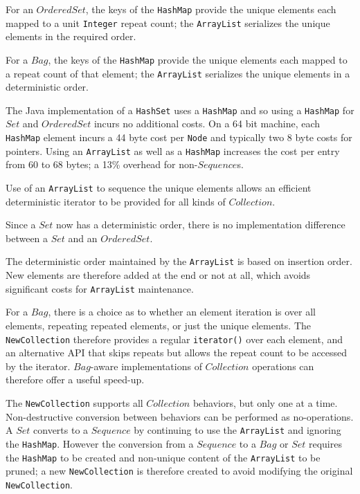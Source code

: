 \documentclass{llncs}
\begin{document}
For an $OrderedSet$, the keys of the \verb$HashMap$ provide the unique elements each mapped to a unit \verb$Integer$ repeat count; the \verb$ArrayList$ serializes the unique elements in the required order.

For a $Bag$, the keys of the \verb$HashMap$ provide the unique elements each mapped to a repeat count of that element; the \verb$ArrayList$ serializes the unique elements in a deterministic order.

The Java implementation of a \verb$HashSet$ uses a \verb$HashMap$ and so using a \verb$HashMap$ for $Set$ and $OrderedSet$ incurs no additional costs. On a 64 bit machine, each \verb$HashMap$ element incurs a 44 byte cost per \verb$Node$ and typically two 8 byte costs for pointers. Using an \verb$ArrayList$ as well as a \verb$HashMap$ increases the cost per entry from 60 to 68 bytes; a 13\% overhead for non-$Sequence$s.

Use of an \verb$ArrayList$ to sequence the unique elements allows an efficient deterministic iterator to be provided for all kinds of $Collection$.

Since a $Set$ now has a deterministic order, there is no implementation difference between a $Set$ and an $OrderedSet$.

The deterministic order maintained by the \verb$ArrayList$ is based on insertion order. New elements are therefore added at the end or not at all, which avoids significant costs for \verb$ArrayList$ maintenance.

For a $Bag$, there is a choice as to whether an element iteration is over all elements, repeating repeated elements, or just the unique elements. The \verb$NewCollection$ therefore provides a regular \verb$iterator()$ over each element, and an alternative API that skips repeats but allows the repeat count to be accessed by the iterator. $Bag$-aware implementations of $Collection$ operations can therefore offer a useful speed-up.

The \verb$NewCollection$ supports all $Collection$ behaviors, but only one at a time. Non-destructive conversion between behaviors can be performed as no-operations. A $Set$ converts to a $Sequence$ by continuing to use the \verb$ArrayList$ and ignoring the \verb$HashMap$. However the conversion from a $Sequence$ to a $Bag$ or $Set$ requires the \verb$HashMap$ to be created and non-unique content of the \verb$ArrayList$ to be pruned; a new \verb$NewCollection$ is therefore created to avoid modifying the original \verb$NewCollection$.
\end{document}
